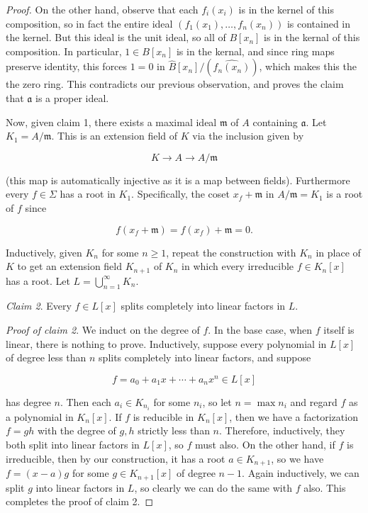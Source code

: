 \begin{proof}
On the other hand, observe that each $ f_i(x_i)$ is in the kernel of this composition, so in fact the entire ideal $ (f_1(x_1), \dotsc, f_n(x_n))$ is contained in the kernel. But this ideal is the unit ideal, so all of $ B[x_n]$ is in the kernal of this composition. In particular, $ 1 \in B[x_n]$ is in the kernal, and since ring maps preserve identity, this forces $ 1 = 0$ in $ \hat{B}[x_n]/(\widehat{f_n(x_n)})$, which makes this the the zero ring. This contradicts our previous observation, and proves the claim that $ \mathfrak{a}$ is a proper ideal.

Now, given claim 1, there exists a maximal ideal $ \mathfrak{m}$ of $ A$ containing $ \mathfrak{a}$. Let $ K_1 = A/\mathfrak{m}$. This is an extension field of $ K$ via the inclusion given by

\[ K \to A \to A/\mathfrak{m} \]

(this map is automatically injective as it is a map between fields). Furthermore every $ f \in \Sigma$ has a root in $ K_1$. Specifically, the coset $ x_f + \mathfrak{m}$ in $ A/\mathfrak{m} = K_1$ is a root of $ f$ since

\[ f(x_f + \mathfrak{m}) = f(x_f) + \mathfrak{m} = 0. \]

Inductively, given $ K_n$ for some $ n \geq 1$, repeat the construction with $ K_n$ in place of $ K$ to get an extension field $ K_{n+1}$ of $ K_n$ in which every irreducible $ f \in K_n[x]$ has a root. Let $ L = \bigcup_{n = 1}^{\infty} K_n$.

\emph{Claim 2}. Every $ f \in L[x]$ splits completely into linear factors in $ L$.

\emph{Proof of claim 2}. We induct on the degree of $ f$. In the base case, when $ f$ itself is linear, there is nothing to prove. Inductively, suppose every polynomial in $ L[x]$ of degree less than $ n$ splits completely into linear factors, and suppose

\[ f = a_0 + a_1x + \dotsb + a_nx^n \in L[x] \]

has degree $ n$. Then each $ a_i \in K_{n_i}$ for some $ n_i$, so let $ n = \max n_i$ and regard $ f$ as a polynomial in $ K_n[x]$. If $ f$ is reducible in $ K_n[x]$, then we have a factorization $ f = gh$ with the degree of $ g, h$ strictly less than $ n$. Therefore, inductively, they both split into linear factors in $ L[x]$, so $ f$ must also. On the other hand, if $ f$ is irreducible, then by our construction, it has a root $ a\in K_{n+1}$, so we have $ f = (x - a) g$ for some $ g \in K_{n+1}[x]$ of degree $ n - 1$. Again inductively, we can split $ g$ into linear factors in $ L$, so clearly we can do the same with $ f$ also. This completes the proof of claim 2.


\end{proof}
